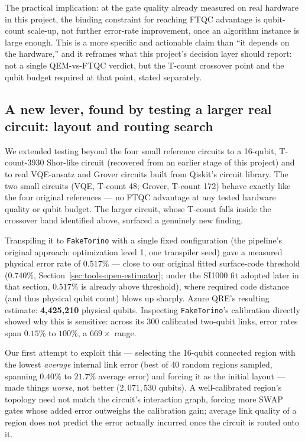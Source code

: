 \documentclass[9pt,twocolumn]{extarticle}
\begin{document}
The practical implication: at the gate quality already measured on real
hardware in this project, the binding constraint for reaching FTQC
advantage is qubit-count scale-up, not further error-rate improvement, once
an algorithm instance is large enough. This is a more specific and
actionable claim than ``it depends on the hardware,'' and it reframes what
this project's decision layer should report: not a single QEM-vs-FTQC
verdict, but the T-count crossover point and the qubit budget required at
that point, stated separately.

\subsection{A new lever, found by testing a larger real circuit: layout and routing search}
\label{sec:layout-search}
We extended testing beyond the four small reference circuits to a
16-qubit, T-count-3930 Shor-like circuit (recovered from an earlier stage
of this project) and to real VQE-ansatz and Grover circuits built from
Qiskit's circuit library. The two small circuits (VQE, T-count 48; Grover,
T-count 172) behave exactly like the four original references --- no FTQC
advantage at any tested hardware quality or qubit budget. The larger
circuit, whose T-count falls inside the crossover band identified above,
surfaced a genuinely new finding.

Transpiling it to \texttt{FakeTorino} with a single fixed configuration
(the pipeline's original approach: optimization level 1, one transpiler
seed) gave a measured physical error rate of $0.517\%$ --- close to our
original fitted surface-code threshold ($0.740\%$, Section~\ref{sec:tools-open-estimator};
under the SI1000 fit adopted later in that section, $0.517\%$ is already above threshold),
where required code distance (and thus physical qubit count) blows up
sharply. Azure QRE's resulting estimate: \textbf{4{,}425{,}210} physical
qubits. Inspecting \texttt{FakeTorino}'s calibration directly showed why
this is sensitive: across its 300 calibrated two-qubit links, error rates
span $0.15\%$ to $100\%$, a $669\times$ range.

Our first attempt to exploit this --- selecting the 16-qubit connected
region with the lowest \emph{average} internal link error (best of 40
random regions sampled, spanning $0.40\%$ to $21.7\%$ average error) and
forcing it as the initial layout --- made things \emph{worse}, not better
($2{,}071{,}530$ qubits). A well-calibrated region's topology need not
match the circuit's interaction graph, forcing more SWAP gates whose added
error outweighs the calibration gain; average link quality of a region
does not predict the error actually incurred once the circuit is routed
onto it.
\end{document}
